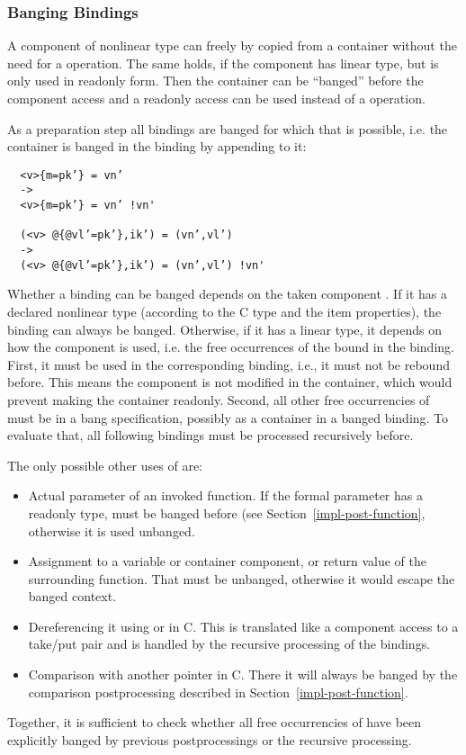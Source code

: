 \subsubsection{Banging  Bindings}

A component of nonlinear type can freely by copied from a container without the need for a  operation. The same holds, if the 
component has linear type, but is only used in readonly form. Then the container can be ``banged'' before the component access and a readonly
access can be used instead of a  operation.

As a preparation step all  bindings are banged for which that is possible, i.e. the container is banged in the binding by appending
 to it:
\begin{verbatim}
  <v>{m=pk’} = vn’
  ->
  <v>{m=pk’} = vn’ !vn'

  (<v> @{@vl’=pk’},ik’) = (vn’,vl’)
  ->
  (<v> @{@vl’=pk’},ik’) = (vn’,vl’) !vn'
\end{verbatim}

Whether a  binding can be banged depends on the taken component . If it has a declared nonlinear type (according to the C 
type and the item properties), the  binding can always be banged. Otherwise, if it has a linear type, it depends on how the 
component  is used, i.e. the free occurrences of the  bound in the  binding. First, it must be used in 
the corresponding  binding, i.e., it must not be rebound before. This means the component is not modified in the container, 
which would prevent making the container readonly. Second, all other free occurrencies of  must be in a bang specification, 
possibly as a container in a banged  binding. To evaluate that, all following  bindings must be processed 
recursively before. 

The only possible other uses of  are:
\begin{itemize}
\item Actual parameter of an invoked function. If the formal parameter has a readonly type,  must be banged before (see 
Section~\ref{impl-post-function}, otherwise it is used unbanged.
\item Assignment to a variable or container component, or return value of the surrounding function. That must be unbanged, 
otherwise it would escape the banged context.
\item Dereferencing it using \code{*} or \code{->} in C. This is translated like a component access to a take/put pair and is
handled by the recursive processing of the  bindings.
\item Comparison with another pointer in C. There it will always be banged by the comparison postprocessing described in 
Section~\ref{impl-post-function}.
\end{itemize}
Together, it is sufficient to check whether all free occurrencies of  have been explicitly banged by previous 
postprocessings or the recursive  processing.

